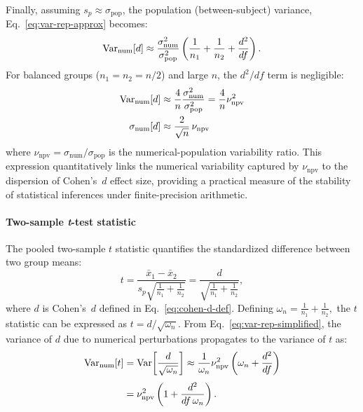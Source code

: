 Finally, assuming $s_p \approx \sigma_{\mathrm{pop}}$, the population
(between-subject) variance, Eq.~\eqref{eq:var-rep-approx} becomes:
\begin{equation}
    \mathrm{Var}_{\mathrm{num}}[d]
    \approx
    \frac{\sigma_{\mathrm{num}}^2}{\sigma_{\mathrm{pop}}^2}
    \left(\frac{1}{n_1}+\frac{1}{n_2}+\frac{d^2}{df}\right).
    \label{eq:var-rep-simplified}
\end{equation}
For balanced groups ($n_1 = n_2 = n/2$) and large $n$, the $d^2/df$ term is
negligible:
\begin{align*}
    \mathrm{Var}_{\mathrm{num}}[d]   & \approx \frac{4}{n} \frac{\sigma_{\mathrm{num}}^2}{\sigma_{\mathrm{pop}}^2}   = \frac{4}{n} \nu_{\mathrm{npv}}^2 \\
    \sigma_{\mathrm{num}}[d] & \approx \frac{2}{\sqrt{n}}\,\nu_{\mathrm{npv}}
    \label{eq:var-rep-final-simplified}
\end{align*}
where $\nu_{\mathrm{npv}} = \sigma_{\mathrm{num}} / \sigma_{\mathrm{pop}}$ is
the numerical-population variability ratio. This expression quantitatively links
the numerical variability captured by $\nu_{\mathrm{npv}}$ to the dispersion of
Cohen's~$d$ effect size, providing a practical measure of the stability of
statistical inferences under finite-precision arithmetic.

\paragraph{Two-sample \textit{t}-test statistic}

The pooled two-sample $t$ statistic quantifies the standardized difference
between two group means:
\begin{equation*}
    t =
    \frac{\bar{x}_1 - \bar{x}_2}{s_p\sqrt{\tfrac{1}{n_1} + \tfrac{1}{n_2}}}
    =
    \frac{d}{\sqrt{\tfrac{1}{n_1} + \tfrac{1}{n_2}}},
    \label{eq:t-stat-def}
\end{equation*}
where $d$ is Cohen's~$d$ defined in Eq.~\eqref{eq:cohen-d-def}. Defining
\(
\omega_n = \tfrac{1}{n_1} + \tfrac{1}{n_2},
\)
the $t$ statistic can be expressed as \(t = d / \sqrt{\omega_n}\). From
Eq.~\eqref{eq:var-rep-simplified}, the variance of $d$ due to numerical
perturbations propagates to the variance of $t$ as:
\begin{equation}
    \begin{aligned}
        \mathrm{Var}_{\mathrm{num}}[t]
         & =
        \mathrm{Var}\!\left[\frac{d}{\sqrt{\omega_n}}\right]
        \approx
        \frac{1}{\omega_n}
        \nu_{\mathrm{npv}}^{2}
        \left(\omega_n + \frac{d^{2}}{df}\right) \\[3pt]
         & =
        \nu_{\mathrm{npv}}^{2}
        \left(1 + \frac{d^{2}}{df\,\omega_n}\right).
        \label{eq:t-var-approx}
    \end{aligned}
\end{equation}

